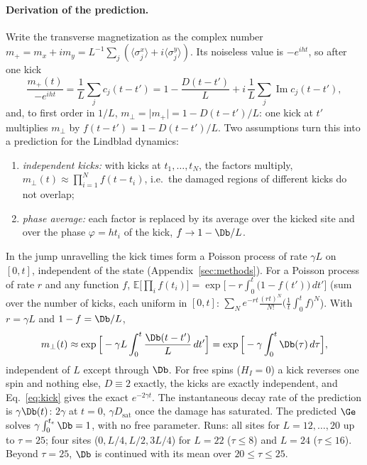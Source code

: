 \paragraph{Derivation of the prediction.} Write the transverse magnetization as the complex number $m_+ = m_x + i m_y = L^{-1}\sum_j(\langle\sigma^x_j\rangle + i\langle\sigma^y_j\rangle)$. Its noiseless value is $-e^{iht}$, so after one kick
\[ \frac{m_+(t)}{-e^{iht}} = \frac1L\sum_j c_j(t - t') = 1 - \frac{D(t - t')}{L} + i\,\frac1L\sum_j\operatorname{Im}c_j(t - t'), \]
and, to first order in $1/L$, $m_\perp = \lvert m_+\rvert = 1 - D(t-t')/L$: one kick at $t'$ multiplies $m_\perp$ by $f(t - t') = 1 - D(t - t')/L$. Two assumptions turn this into a prediction for the Lindblad dynamics:
\begin{enumerate}
\item \emph{independent kicks:} with kicks at $t_1, \dots, t_N$, the factors multiply, $m_\perp(t) \approx \prod_{i=1}^N f(t - t_i)$, i.e.\ the damaged regions of different kicks do not overlap;
\item \emph{phase average:} each factor is replaced by its average over the kicked site and over the phase $\varphi = ht_i$ of the kick, $f \to 1 - \Db/L$.
\end{enumerate}
In the jump unravelling the kick times form a Poisson process of rate $\gamma L$ on $[0, t]$, independent of the state (Appendix~\ref{sec:methods}). For a Poisson process of rate $r$ and any function $f$, $\mathbb E\big[\prod_i f(t_i)\big] = \exp\big[-r\int_0^t\big(1 - f(t')\big)\,dt'\big]$ (sum over the number of kicks, each uniform in $[0,t]$: $\sum_N e^{-rt}\frac{(rt)^N}{N!}\big(\tfrac1t\int_0^t f\big)^N$). With $r = \gamma L$ and $1 - f = \Db/L$,
\begin{equation}
m_\perp(t) \approx \exp\Big[-\gamma L \int_0^t \frac{\Db(t - t')}{L}\,dt'\Big] = \exp\Big[-\gamma\int_0^t \Db(\tau)\,d\tau\Big],
\label{eq:kick}
\end{equation}
independent of $L$ except through $\Db$. For free spins ($H_I = 0$) a kick reverses one spin and nothing else, $D \equiv 2$ exactly, the kicks are exactly independent, and Eq.~\eqref{eq:kick} gives the exact $e^{-2\gamma t}$. The instantaneous decay rate of the prediction is $\gamma\Db(t)$: $2\gamma$ at $t = 0$, $\gamma D_{\mathrm{sat}}$ once the damage has saturated. The predicted $\Ge$ solves $\gamma\int_0^{t_e}\Db = 1$, with no free parameter. Runs: all sites for $L = 12,\dots,20$ up to $\tau = 25$; four sites ($0, L/4, L/2, 3L/4$) for $L = 22$ ($\tau \le 8$) and $L = 24$ ($\tau \le 16$). Beyond $\tau = 25$, $\Db$ is continued with its mean over $20 \le \tau \le 25$.

